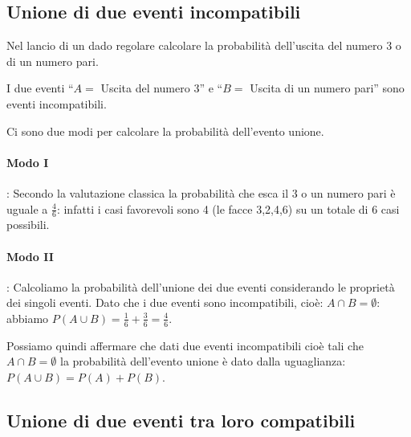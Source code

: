 \subsection{Unione di due eventi incompatibili}

\begin{esempio}
Nel lancio di un dado regolare calcolare la probabilità dell'uscita del 
numero 
3 
o di un numero pari.

I due eventi ``\( A= \) Uscita del numero 3'' e ``\( B= \) Uscita di un numero 
pari'' sono eventi incompatibili.

Ci sono due modi per calcolare la probabilità dell'evento unione.
\paragraph{Modo I}: Secondo la valutazione classica la probabilità che esca 
il 
\(3\) o un numero pari è uguale a \(\frac 4 6\): infatti i casi favorevoli sono 4 
(le facce 3,2,4,6) su un totale di \(6\) casi possibili.
\paragraph{Modo II}: Calcoliamo la probabilità dell'unione dei due eventi 
considerando le proprietà dei singoli eventi. Dato che i due eventi sono 
incompatibili, cioè: \(A\cap B=\emptyset \): abbiamo \(P(A\cup B)=\frac 1 
6+\frac 
3 
6=\frac 4 6\).

\end{esempio}

Possiamo quindi affermare che dati due eventi incompatibili cioè tali che 
\(A\cap 
B=\emptyset \) la probabilità dell'evento unione è dato dalla uguaglianza: 
\(P(A\cup B)=P(A)+P(B)\).


\subsection{Unione di due eventi tra loro compatibili}

